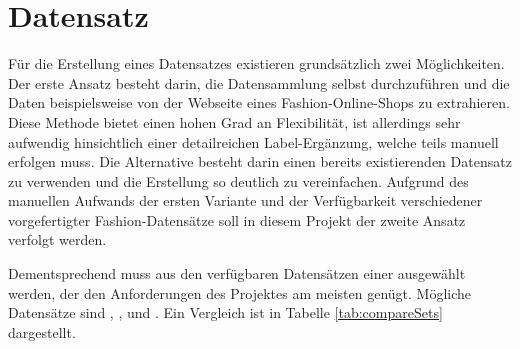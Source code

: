 \section{Datensatz} \label{sec:data_set}

Für die Erstellung eines Datensatzes existieren grundsätzlich zwei Möglichkeiten. Der erste Ansatz besteht darin, die Datensammlung selbst durchzuführen und die Daten beispielsweise von der Webseite eines Fashion-Online-Shops zu extrahieren. Diese Methode bietet einen hohen Grad an Flexibilität, ist allerdings sehr aufwendig hinsichtlich einer detailreichen Label-Ergänzung, welche teils manuell erfolgen muss. Die Alternative besteht darin einen bereits existierenden Datensatz zu verwenden und die Erstellung so deutlich zu vereinfachen. Aufgrund des manuellen Aufwands der ersten Variante und der Verfügbarkeit verschiedener vorgefertigter Fashion-Datensätze soll in diesem Projekt der zweite Ansatz verfolgt werden.

Dementsprechend muss aus den verfügbaren Datensätzen einer ausgewählt werden, der den Anforderungen des Projektes am meisten genügt. Mögliche Datensätze sind  \cite{FashionProduct2019},  \cite{Fashionpedia2020},  \cite{FashionMNIST2017} und  \cite{DeepFashion2016}. Ein Vergleich ist in Tabelle \ref{tab:compareSets} dargestellt. 

\begin{table}[H]
	\centering
	\caption{Vergleich verschiedener Fashion-Datensätze}
	\label{tab:compareSets}
\end{table}

